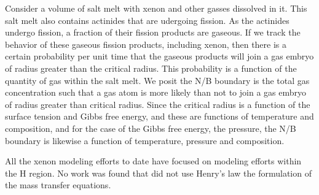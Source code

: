 Consider a volume of salt melt with xenon and other gasses dissolved in it. This salt melt also contains actinides that are udergoing fission.  As the actinides undergo fission, a fraction of their fission products are gaseous.  If we track the behavior of these gaseous fission products, including xenon, then there is a certain probability per unit time that the gaseous products will join a gas embryo of radius greater than the critical radius.  This probability is a function of the quantity of gas within the salt melt.  We posit the N/B boundary is the total gas concentration such that a gas atom is more likely than not to join a gas embryo of radius greater than critical radius.  Since the critical radius is a function of the surface tension and Gibbs free energy, and these are functions of temperature and composition, and for the case of the Gibbs free energy, the pressure, the N/B boundary is likewise a function of temperature, pressure and composition.

All the xenon modeling efforts to date have focused on modeling efforts within the H region.  No work was found that did not use Henry's law the formulation of the mass transfer equations.